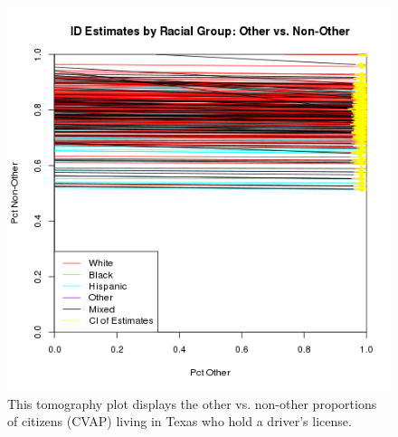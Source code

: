 \documentclass[12pt]{article}
\begin{document}
\begin{figure}[htb]
\begin{centering}
\includegraphics[scale=.75]{figs/CVAP_f3_dl_other.png}
\caption{\label{tomog_other}This tomography plot displays the other vs. non-other proportions of citizens (CVAP)
living in Texas who hold a driver's license.}
\end{centering}
\end{figure}
\end{document}
